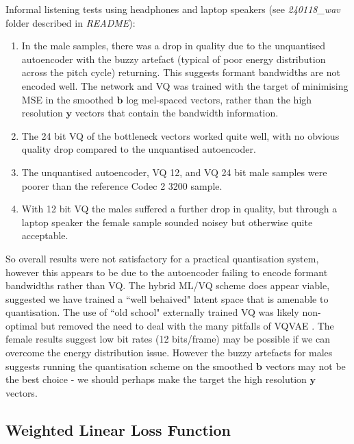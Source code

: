 \documentclass{article}
\begin{document}
Informal listening tests using headphones and laptop speakers (see \emph{240118\_wav} folder described in \emph{README}):
\begin{enumerate}
\item In the male samples, there was a drop in quality due to the unquantised autoencoder with the buzzy artefact (typical of poor energy distribution across the pitch cycle) returning.  This suggests formant bandwidths are not encoded well.  The network and VQ was trained with the target of minimising MSE in the smoothed $\mathbf{b}$ log mel-spaced vectors, rather than the high resolution $\mathbf{y}$ vectors that contain the bandwidth information.
\item The 24 bit VQ of the bottleneck vectors worked quite well, with no obvious quality drop compared to the unquantised autoencoder.
\item The unquantised autoencoder, VQ 12, and VQ 24 bit male samples were poorer than the reference Codec 2 3200 sample.
\item With 12 bit VQ the males suffered a further drop in quality, but through a laptop speaker the female sample sounded noisey but otherwise quite acceptable.
\end{enumerate} 
So overall results were not satisfactory for a practical quantisation system, however this appears to be due to the autoencoder failing to encode formant bandwidths rather than VQ. The hybrid ML/VQ scheme does appear viable, suggested we have trained a ``well behaived" latent space that is amenable to quantisation. The use of ``old school" externally trained VQ was likely non-optimal but removed the need to deal with the many pitfalls of VQVAE \cite{mentzer2023finite}. The female results suggest low bit rates (12 bits/frame) may be possible if we can overcome the energy distribution issue.  However the buzzy artefacts for males suggests running the quantisation scheme on the smoothed $\mathbf{b}$ vectors may not be the best choice - we should perhaps make the target the high resolution $\mathbf{y}$ vectors.


\subsection{Weighted Linear Loss Function}
\end{document}
